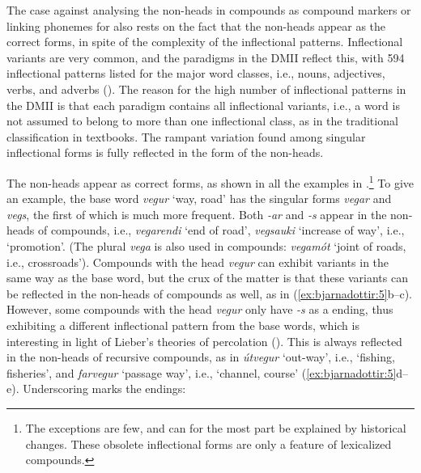 \documentclass[output=paper]{LSP/langsci}
\begin{document}
The case against analysing the  non-heads in  compounds as  compound markers or linking phonemes for  also rests on the fact that
the non-heads appear as the correct  forms, in spite of the complexity of the inflectional patterns. Inflectional variants are very common, and the paradigms in the DMII reflect this, with 594 inflectional patterns listed for the major word classes, i.e., nouns, adjectives, verbs, and adverbs (\citealt{Bjarnadóttir2012}). The reason for the high number of inflectional patterns in the DMII is that each paradigm contains all inflectional variants, i.e., a word is not assumed to belong to more than one inflectional class, as in the traditional classification in  textbooks. The rampant variation found among  singular inflectional forms is fully reflected in the form of the non-heads.

The non-heads appear as correct  forms, as shown in all the examples in .\footnote{The exceptions are few, and can for the most part be explained by historical changes. These obsolete inflectional forms are only a feature of lexicalized compounds.} To give an example, the base word \textit{vegur} ‘way, road’ has the  singular forms \textit{vegar} and \textit{vegs}, the first of which is much more frequent. Both \textit{-ar} and \textit{-s} appear in the non-heads of compounds, i.e., \textit{vegarendi} ‘end of road’, \textit{vegs\-auki} ‘increase of way’, i.e., ‘promotion’. (The  plural \textit{vega} is also used in compounds: \textit{vegamót} ‘joint of roads, i.e., crossroads’). Compounds with the head \textit{vegur} can exhibit variants in the same way as the base word, but the crux of the matter is that these variants can be reflected in the non-heads of compounds as well, as in (\ref{ex:bjarnadottir:5}b–c). However, some compounds with the head \textit{vegur} only have \textit{-s} as a  ending, thus exhibiting a different inflectional pattern from the base words, which is interesting in light of Lieber’s theories of percolation (\citeyear{Lieber1989}). This  is always reflected in the non-heads of recursive compounds, as in \textit{útvegur} ‘out-way’, i.e., ‘fishing, fisheries’, and \textit{farvegur} ‘passage way’, i.e., ‘channel, course’ (\ref{ex:bjarnadottir:5}d–e). Underscoring marks the  endings:
 
\end{document}
